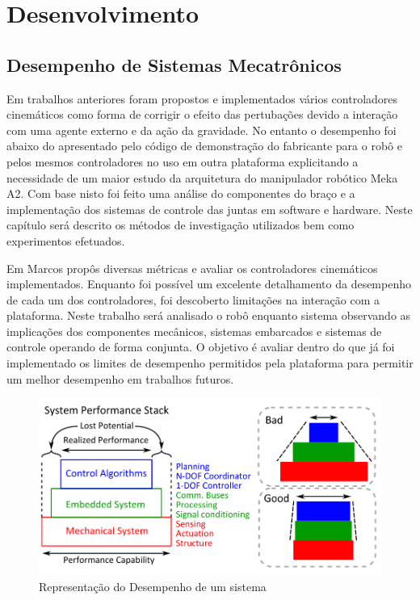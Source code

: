 \chapter{Desenvolvimento\label{ch:develop}}


\section{Desempenho de Sistemas Mecatrônicos}

Em trabalhos anteriores foram propostos e implementados vários controladores cinemáticos como forma de corrigir o efeito das pertubações devido a interação com uma agente externo e da ação da gravidade. No entanto o desempenho foi abaixo do apresentado pelo código de demonstração do fabricante para o robô e pelos mesmos controladores no uso em outra plataforma explicitando a necessidade de um maior estudo da arquitetura do manipulador robótico Meka A2. Com base nisto foi feito uma análise do componentes do braço e a implementação dos sistemas de controle das juntas em software e hardware. Neste capítulo será descrito os métodos de investigação utilizados bem como experimentos efetuados.

Em \cite{marcosps2016} Marcos propôs diversas métricas e avaliar os controladores cinemáticos implementados. Enquanto foi possível um excelente detalhamento da desempenho de cada um dos controladores, foi descoberto limitações na interação com a plataforma. Neste trabalho será analisado o robô enquanto sistema observando as implicações dos componentes mecânicos, sistemas embarcados e sistemas de controle operando de forma conjunta. O objetivo é avaliar dentro do que já foi implementado os limites de desempenho permitidos pela plataforma para permitir um melhor desempenho em trabalhos futuros.

\begin{figure}[H]
    \centering
    \includegraphics[width = 0.9\linewidth]{tex/figs/system_perfomance.png}
    \caption{Representação do Desempenho de um sistema \cite{paine2014high}}
    \label{fig:system_perfomance}
\end{figure}

